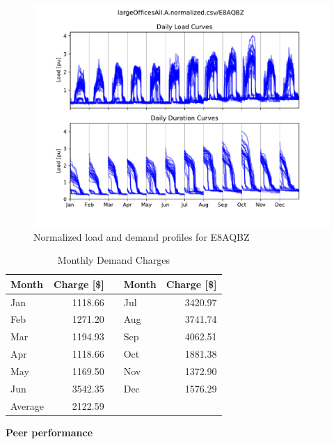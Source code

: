 \documentclass[11pt]{article}
\begin{document}
\pagestyle{demand}
\lipsum[1][1-7]

\begin{figure}[!h]
\centering
\includegraphics[width=\columnwidth, page=1, trim=0in 0.45in 0in 0.45in, clip]{visuals/E8AQBZ.duration.monthly.test.pdf}
\caption{Normalized load and demand profiles for E8AQBZ}
\label{fig:duration}
\end{figure}

\lipsum[1][1-7]

\begin{table}[th!]
  \centering
  \caption{Monthly Demand Charges}
  \vspace{1.5ex}
  \label{tab:demand}
  \begin{tabular}{p{0.75in}rp{0.2in}p{0.75in}r}
    Month & Charge [\$] & & Month & Charge [\$] \\
    \midrule
    Jan & 1118.66 & & Jul & 3420.97 \\
    Feb & 1271.20 & & Aug & 3741.74 \\
    Mar & 1194.93 & & Sep & 4062.51 \\
    Apr & 1118.66 & & Oct & 1881.38 \\
    May & 1169.50 & & Nov & 1372.90 \\
    Jun & 3542.35 & & Dec & 1576.29 \\
    \midrule
    Average & 2122.59
  \end{tabular}
\end{table}

\vspace{3ex}
\textbf{\Large Peer performance}
\vspace{1ex}
\end{document}
